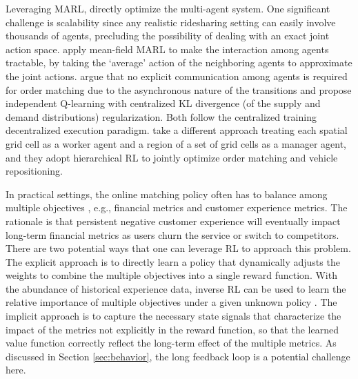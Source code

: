 \documentclass{article}
\begin{document}
Leveraging MARL, \cite{li2019efficient,jin2019coride,zhou2019multi} directly optimize the multi-agent system. One significant challenge is scalability since any realistic ridesharing setting can easily involve thousands of agents, precluding the possibility of dealing with an exact joint action space. \cite{li2019efficient} apply mean-field MARL to make the interaction among agents tractable, by taking the `average' action of the neighboring agents to approximate the joint actions. \cite{zhou2019multi} argue that no explicit communication among agents is required for order matching due to the asynchronous nature of the transitions and propose independent Q-learning with centralized KL divergence (of the supply and demand distributions) regularization. Both \cite{li2019efficient,zhou2019multi} follow the centralized training decentralized execution paradigm. \cite{jin2019coride} take a different approach treating each spatial grid cell as a worker agent and a region of a set of grid cells as a manager agent, and they adopt hierarchical RL to jointly optimize order matching and vehicle repositioning.

In practical settings, the online matching policy often has to balance among multiple objectives \citep{lyu2019multi}, e.g., financial metrics and customer experience metrics. The rationale is that persistent negative customer experience will eventually impact long-term financial metrics as users churn the service or switch to competitors. There are two potential ways that one can leverage RL to approach this problem. The explicit approach is to directly learn a policy that dynamically adjusts the weights to combine the multiple objectives into a single reward function. With the abundance of historical experience data, inverse RL can be used to learn the relative importance of multiple objectives under a given unknown policy \citep{zhou2021multi}. The implicit approach is to capture the necessary state signals that characterize the impact of the metrics not explicitly in the reward function, so that the learned value function correctly reflect the long-term effect of the multiple metrics. As discussed in Section \ref{sec:behavior}, the long feedback loop is a potential challenge here.
\end{document}

